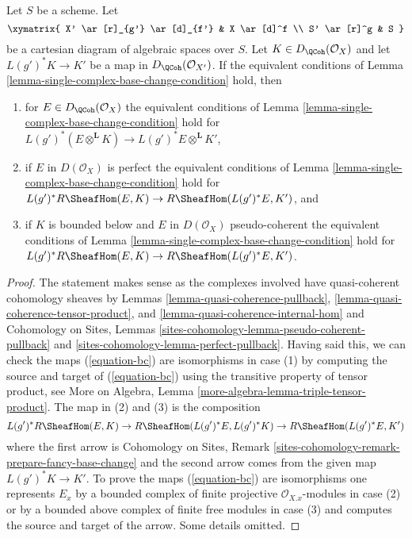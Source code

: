 \begin{lemma}
\label{lemma-single-complex-base-change-condition-inherited}
Let $S$ be a scheme. Let
$$
\xymatrix{
X' \ar[r]_{g'} \ar[d]_{f'} &
X \ar[d]^f \\
S' \ar[r]^g &
S
}
$$
be a cartesian diagram of algebraic spaces over $S$.
Let $K \in D_\QCoh(\mathcal{O}_X)$ and let $L(g')^*K \to K'$
be a map in $D_\QCoh(\mathcal{O}_{X'})$. If the equivalent conditions of
Lemma \ref{lemma-single-complex-base-change-condition} hold, then
\begin{enumerate}
\item for $E \in D_\QCoh(\mathcal{O}_X)$ the equivalent
conditions of Lemma \ref{lemma-single-complex-base-change-condition} hold
for $L(g')^*(E \otimes^\mathbf{L} K) \to L(g')^*E \otimes^\mathbf{L} K'$,
\item if $E$ in $D(\mathcal{O}_X)$ is perfect the equivalent conditions of
Lemma \ref{lemma-single-complex-base-change-condition} hold for
$L(g')^*R\SheafHom(E, K) \to R\SheafHom(L(g')^*E, K')$, and
\item if $K$ is bounded below and $E$ in $D(\mathcal{O}_X)$
pseudo-coherent the equivalent conditions of
Lemma \ref{lemma-single-complex-base-change-condition} hold for
$L(g')^*R\SheafHom(E, K) \to R\SheafHom(L(g')^*E, K')$.
\end{enumerate}
\end{lemma}

\begin{proof}
The statement makes sense as the complexes involved have quasi-coherent
cohomology sheaves by Lemmas
\ref{lemma-quasi-coherence-pullback},
\ref{lemma-quasi-coherence-tensor-product}, and
\ref{lemma-quasi-coherence-internal-hom} and
Cohomology on Sites, Lemmas
\ref{sites-cohomology-lemma-pseudo-coherent-pullback} and
\ref{sites-cohomology-lemma-perfect-pullback}.
Having said this, we can check the maps (\ref{equation-bc})
are isomorphisms in case (1) by computing the source and target
of (\ref{equation-bc}) using the transitive property of tensor product, see
More on Algebra, Lemma \ref{more-algebra-lemma-triple-tensor-product}.
The map in (2) and (3) is the composition
$$
L(g')^*R\SheafHom(E, K) \to R\SheafHom(L(g')^*E, L(g')^*K)
\to R\SheafHom(L(g')^*E, K')
$$
where the first arrow is
Cohomology on Sites, Remark
\ref{sites-cohomology-remark-prepare-fancy-base-change}
and the second arrow comes from the given map $L(g')^*K \to K'$.
To prove the maps (\ref{equation-bc}) are isomorphisms one represents
$E_x$ by a bounded complex of finite projective $\mathcal{O}_{X. x}$-modules
in case (2) or by a bounded above complex of finite free modules in case (3)
and computes the source and target of the arrow.
Some details omitted.
\end{proof}

